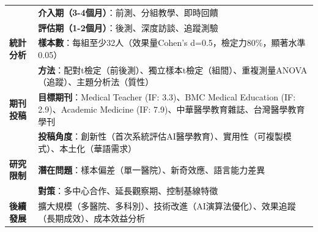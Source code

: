 \documentclass[a4paper,10pt]{article}
\begin{document}
\begin{longtable}{>{\raggedright\arraybackslash}p{2cm}>{\raggedright\arraybackslash}p{12cm}}
& \textbf{介入期（3-4個月）}：前測、分組教學、即時回饋 \\
& \textbf{評估期（1-2個月）}：後測、深度訪談、追蹤測驗 \\
\midrule
\textbf{統計分析} & \textbf{樣本數}：每組至少32人（效果量Cohen's d=0.5，檢定力80\%，顯著水準0.05） \\
& \textbf{方法}：配對t檢定（前後測）、獨立樣本t檢定（組間）、重複測量ANOVA（追蹤）、主題分析法（質性） \\
\midrule
\textbf{期刊投稿} & \textbf{目標期刊}：Medical Teacher (IF: 3.3)、BMC Medical Education (IF: 2.9)、Academic Medicine (IF: 7.9)、中華醫學教育雜誌、台灣醫學教育學刊 \\
& \textbf{投稿角度}：創新性（首次系統評估AI醫學教育）、實用性（可複製模式）、本土化（華語需求） \\
\midrule
\textbf{研究限制} & \textbf{潛在問題}：樣本偏差（單一醫院）、新奇效應、語言能力差異 \\
& \textbf{對策}：多中心合作、延長觀察期、控制基線特徵 \\
\midrule
\textbf{後續發展} & 擴大規模（多醫院、多科別）、技術改進（AI演算法優化）、效果追蹤（長期成效）、成本效益分析 \\
\bottomrule
\end{longtable}
\end{document}
